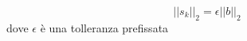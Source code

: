 $$ ||s_k||_2 = \epsilon ||b||_2$$
dove $\epsilon$ \`e una tolleranza prefissata


\begin{comment}
\section{Bad Stuff}
Consideriamo queste equazioni come una serie di misurazioni.
Non \`e detto assolutamente che ci sia soluzione:
cercheremo il vettore che minimizza.
la norma 2.
Con Bigi vedremo il caso non lineare.

$$ \min || r || _{2} = \min ||Ax -b ||_{2} $$
$$ r - Ax $$
$$ X = \{ x \in \in \mathbb{C}^{n} 
\text{ che rendono minima } || r ||_{2} \}
$$
Metodi possibili:
\begin{itemize}
 \item Equazioni normali
 \item Metodo QR (Householder)
 \item Fattorizzazione SVD
 \item Gradiente coniugato
\end{itemize}

\section{Metodo delle equazioni normali}
$$ Ax = b$$
$\mathbb{C}^{m}$
può essere espressa come 
$$\mathbb{C}^{m} = S(A) \oplus S(A)^{\bot}$$
$\bot : \text{ ortogonale } $
$$ S(A) = \{ y \in \mathbb{C}^{m}: y = Ax 
\text{ per qualche } x \in \mathbb{C}^{m} \}$$
e
$$
S(A)^{\bot} = \{ z \in \mathbb{C}^{m} \;
: \; z^{H}y = 0,  \forall y \in S(A) \}
$$


\end{comment}
